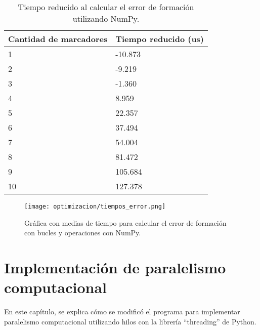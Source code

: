 \begin{table}[H]
	\centering
	\resizebox{0.5\textwidth}{!} {
	\begin{tabular}{|l|l|}
		\hline
		\textbf{Cantidad de marcadores} & \textbf{Tiempo reducido (us)} \\ \hline
		1                               & -10.873                       \\ \hline
		2                               & -9.219                        \\ \hline
		3                               & -1.360                        \\ \hline
		4                               & 8.959                         \\ \hline
		5                               & 22.357                        \\ \hline
		6                               & 37.494                        \\ \hline
		7                               & 54.004                        \\ \hline
		8                               & 81.472                        \\ \hline
		9                               & 105.684                       \\ \hline
		10                              & 127.378                       \\ \hline
	\end{tabular}}
	\caption{Tiempo reducido al calcular el error de formación utilizando NumPy.}
	\label{cuadro:tiempo_reducido_error}
\end{table}

\begin{figure}[H]
	\centering
	\texttt{[image: optimizacion/tiempos\_error.png]}
	\caption{Gráfica con medias de tiempo para calcular el error de formación con bucles y operaciones con NumPy.}
	\label{fig:grafica_tiempos_error}
\end{figure}

\section{Implementación de paralelismo computacional}
En este capítulo, se explica cómo se modificó el programa para implementar paralelismo computacional utilizando hilos con la librería ``threading'' de Python.

